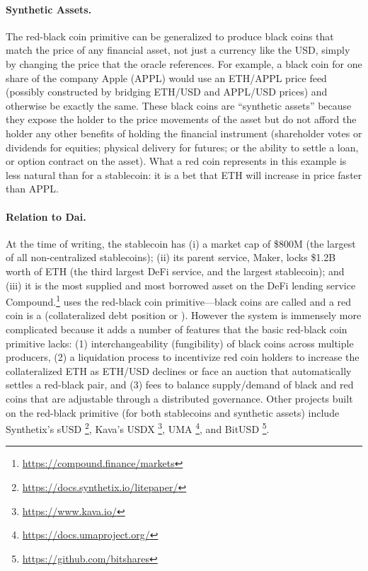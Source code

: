 \paragraph{Synthetic Assets.} The red-black coin primitive can be generalized to produce black coins that match the price of any financial asset, not just a currency like the USD, simply by changing the price that the oracle references. For example, a black coin for one share of the company Apple (APPL) would use an ETH/APPL price feed (possibly constructed by bridging ETH/USD and APPL/USD prices) and otherwise be exactly the same. These black coins are ``synthetic assets'' because they expose the holder to the price movements of the asset but do not afford the holder any other benefits of holding the financial instrument (\eg shareholder votes or dividends for equities; physical delivery for futures; or the ability to settle a loan, or option contract on the asset). What a red coin represents in this example is less natural than for a stablecoin: it is a bet that ETH will increase in price faster than APPL.

\paragraph{Relation to Dai.} At the time of writing, the stablecoin \dai has (i) a market cap of \$800M (the largest of all non-centralized stablecoins); (ii) its parent service, Maker, locks \$1.2B worth of ETH (the third largest DeFi service, and the largest stablecoin); and (iii) it is the most supplied and most borrowed asset on the DeFi lending service Compound.\footnote{\url{https://compound.finance/markets}} \dai uses the red-black coin primitive---black coins are called \dai and a red coin is a \vault (\nee collateralized debt position or \cdp). However the system is immensely more complicated because it adds a number of features that the basic red-black coin primitive lacks: (1) interchangeability (fungibility) of black coins across multiple producers, (2) a liquidation process to incentivize red coin holders to increase the collateralized ETH as ETH/USD declines or face an auction that automatically settles a red-black pair, and (3) fees to balance supply/demand of black and red coins that are adjustable through a distributed governance. Other projects built on the red-black primitive (for both stablecoins and synthetic assets) include Synthetix's sUSD \footnote{\url{https://docs.synthetix.io/litepaper/}}, Kava's USDX \footnote{\url{https://www.kava.io/}}, UMA \footnote{\url{https://docs.umaproject.org/}}, and BitUSD \footnote{\url{https://github.com/bitshares}}. 

